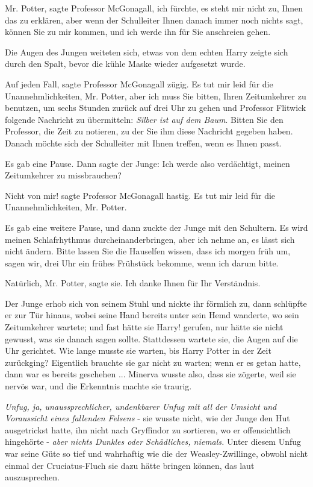 \glqq{}Mr. Potter\grqq{}, sagte Professor McGonagall, \glqq{}ich fürchte, es steht
mir nicht zu, Ihnen das zu erklären, aber wenn der Schulleiter Ihnen danach
immer noch nichts sagt, können Sie zu mir kommen, und ich werde ihn für Sie
anschreien gehen.\grqq{}

Die Augen des Jungen weiteten sich, etwas von dem echten Harry zeigte sich durch
den Spalt, bevor die kühle Maske wieder aufgesetzt wurde.

\glqq{}Auf jeden Fall\grqq{}, sagte Professor McGonagall zügig. \glqq{}Es tut mir
leid für die Unannehmlichkeiten, Mr. Potter, aber ich muss Sie bitten, Ihren
Zeitumkehrer zu benutzen, um sechs Stunden zurück auf drei Uhr zu gehen und
Professor Flitwick folgende Nachricht zu übermitteln: \emph{Silber ist auf dem
Baum}. Bitten Sie den Professor, die Zeit zu notieren, zu der Sie ihm diese
Nachricht gegeben haben. Danach möchte sich der Schulleiter mit Ihnen treffen,
wenn es Ihnen passt.\grqq{}

Es gab eine Pause. Dann sagte der Junge: \glqq{}Ich werde also verdächtigt,
meinen Zeitumkehrer zu missbrauchen?\grqq{}

\glqq{}Nicht von mir!\grqq{} sagte Professor McGonagall hastig. \glqq{}Es tut mir
leid für die Unannehmlichkeiten, Mr. Potter.\grqq{}

Es gab eine weitere Pause, und dann zuckte der Junge mit den Schultern. \glqq{}Es
wird meinen Schlafrhythmus durcheinanderbringen, aber ich nehme an, es lässt
sich nicht ändern. Bitte lassen Sie die Hauselfen wissen, dass ich morgen früh
um, sagen wir, drei Uhr ein frühes Frühstück bekomme, wenn ich darum
bitte.\grqq{}

\glqq{}Natürlich, Mr. Potter\grqq{}, sagte sie. \glqq{}Ich danke Ihnen für Ihr
Verständnis.\grqq{}

Der Junge erhob sich von seinem Stuhl und nickte ihr förmlich zu, dann schlüpfte
er zur Tür hinaus, wobei seine Hand bereits unter sein Hemd wanderte, wo sein
Zeitumkehrer wartete; und fast hätte sie \glqq{}Harry!\grqq{} gerufen, nur hätte
sie nicht gewusst, was sie danach sagen sollte. Stattdessen wartete sie, die
Augen auf die Uhr gerichtet. Wie lange musste sie warten, bis Harry Potter in
der Zeit zurückging? Eigentlich brauchte sie gar nicht zu warten; wenn er es
getan hatte, dann war es bereits geschehen ... Minerva wusste also, dass sie
zögerte, weil sie nervös war, und die Erkenntnis machte sie traurig.

\emph{Unfug, ja, unaussprechlicher, undenkbarer Unfug mit all der Umsicht und
Voraussicht eines fallenden Felsens} - sie wusste nicht, wie der Junge den Hut
ausgetrickst hatte, ihn nicht nach Gryffindor zu sortieren, wo er offensichtlich
hingehörte - \emph{aber nichts Dunkles oder Schädliches, niemals.} Unter diesem
Unfug war seine Güte so tief und wahrhaftig wie die der Weasley-Zwillinge,
obwohl nicht einmal der Cruciatus-Fluch sie dazu hätte bringen können, das laut
auszusprechen.

